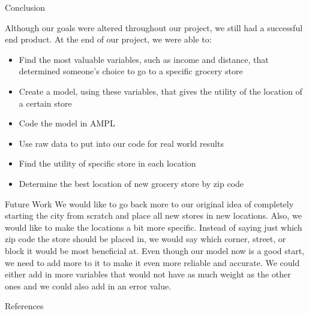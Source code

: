 \documentclass[final]{beamer}
\newlength{\onecolwid}
\begin{document}
\begin{frame}[t]
\begin{columns}[t]
\begin{column}{\onecolwid}
\begin{block}{Conclusion}
{\small
Although our goals were altered throughout our project, we still had a successful end product.  At the end of our project, we were able to:
\begin{itemize}
\item Find the most valuable variables, such as income and distance, that determined someone's choice to go to a specific grocery store
\item Create a model, using these variables, that gives the utility of the location of a certain store
\item Code the model in AMPL 
\item Use raw data to put into our code for real world results
\item Find the utility of specific store in each location
\item Determine the best location of new grocery store by zip code
\end{itemize}

}
\end{block}




\begin{block}{Future Work}
{\small
We would like to go back more to our original idea of completely starting the city from scratch and place all new stores in new locations.  Also, we would like to make the locations a bit more specific.  Instead of saying just which zip code the store should be placed in, we would say which corner, street, or block it would be most beneficial at. Even though our model now is a good start, we need to add more to it to make it even more reliable and accurate.  We could either add in more variables that would not have as much weight as the other ones and we could also add in an error value.   
}
\end{block}


\begin{block}{References}
{\small

\begin{biblist}
\end{biblist}
}
\end{block}


\end{column}
\end{columns}
\end{frame}
\end{document}
